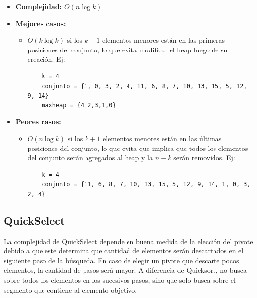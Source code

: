 \documentclass[a4paper,10pt]{article}
\begin{document}
\begin{itemize}
\item \textbf{Complejidad:} $O(n \log{k})$
\item \textbf{Mejores casos:}
	\begin{itemize}
	\item $O(k \log{k})$ si los $k+1$ elementos menores están en las primeras posiciones del conjunto, lo que evita modificar el heap luego de su creación. Ej:
	\begin{verbatim}
	k = 4
	conjunto = {1, 0, 3, 2, 4, 11, 6, 8, 7, 10, 13, 15, 5, 12, 9, 14}
	maxheap = {4,2,3,1,0}
	\end{verbatim}
	\end{itemize}
\item \textbf{Peores casos:}
	\begin{itemize}
	\item $O(n \log{k})$ si los $k+1$ elementos menores están en las últimas posiciones del conjunto, lo que evita que implica que todos los elementos del conjunto serán agregados al heap y la $n-k$ serán removidos. Ej:
	\begin{verbatim}
	k = 4
	conjunto = {11, 6, 8, 7, 10, 13, 15, 5, 12, 9, 14, 1, 0, 3, 2, 4}
	\end{verbatim}
	\end{itemize}
\end{itemize}

\subsection{QuickSelect}

La complejidad de QuickSelect depende en buena medida de la elección del pivote debido a que este determina que cantidad de elementos serán descartados en el siguiente paso de la búsqueda. En caso de elegir un pivote que descarte pocos elementos, la cantidad de pasos será mayor. A diferencia de Quicksort, no busca sobre todos los elementos en los sucesivos pasos, sino que solo busca sobre el segmento que contiene al elemento objetivo.
\end{document}
